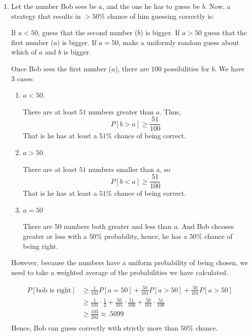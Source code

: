\documentclass[12pt]{article}
\begin{document}
\begin{solution}
    \bbni
    \begin{enumerate}
        \item Let the number Bob sees be $a$, and the one he has to guess be $b$. Now, a strategy that results in $>50\%$ chance of him guessing correctly is:
        
        If $a < 50$, guess that the second number ($b$) is bigger. If $a > 50$ guess that the first number ($a$) is bigger. If $a = 50$, make a uniformly random guess about which of $a$ and $b$ is bigger. 

        Once Bob sees the first number ($a$), there are $100$ possibilities for $b$. We have 3 cases: 

        \begin{enumerate}
            \item $a < 50$. 
            
            There are at least $51$ numbers greater than $a$. Thus, \[P[b>a] \geq \frac{51}{100}\]
            That is he has at least a $51\%$ chance of being correct. 
            \item $a>50$. 
            
            There are at least $51$ numbers smaller than a, so 
             \[P[b < a] \geq \frac{51}{100}\]
            That is he has at least a $51\%$ chance of being correct. 
             
            \item $a = 50$ 

            There are $50$ numbers both greater and less than $a$. And Bob chooses greater or less with a $50\%$ probability, hence, he has a $50\%$ chance of being right.    
        \end{enumerate}
        
        However, because the numbers have a uniform probability of being chosen, we need to take a weighted average of the probabilities we have calculated. 
        
        \begin{align*}
            P[\text{bob is right}] &\geq \frac{1}{101} P[a=50] +  \frac{50}{101} P[a>50] +  \frac{50}{101} P[a>50] \\ 
            &\geq \frac{1}{101} \cdot \frac{1}{2} +  \frac{50}{101} \cdot \frac{51}{100} +  \frac{50}{101} \cdot  \frac{51}{100} \\ 
            &\geq \frac{103}{202} \approx .5099\\ 
        \end{align*}
        Hence, Bob can guess correctly with strictly more than $50\%$ chance. 
        

\end{enumerate}
\end{solution}
\end{document}
